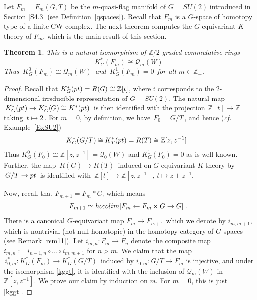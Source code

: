 \documentclass[11pt]{amsart}
\newtheorem{theorem}{Theorem}[section]
\theoremstyle{definition}
\theoremstyle{remark}
\numberwithin{equation}{section}
\newcommand{\la}{\label}
\def\cQ{\mathcal{Q}}
\def\Z{\mathbb{Z}}
\begin{document}
Let $ F_m = F_m(G,T) $ be the $m$-quasi-flag manifold of $G = SU(2) $ introduced in Section \ref{S4.3} (see Definition~\ref{qspaces}). Recall that $ F_m $ is a $G$-space of homotopy type of a finite CW-complex. 
The next theorem computes the $G$-equivariant $K$-theory of $F_m$, which is the main result of this section.
 
\begin{theorem} 
\la{ektmq} 
This is a natural isomorphism of $\Z/2$-graded commutative rings
%
$$
K^{\ast}_G(F_m) \cong \cQ_m(W)
$$
%
Thus $\,K^0_G(F_m) \cong \cQ_m (W)\,$ and $\,K^1_G(F_m) = 0\,$ for all $ m \in \Z_+ $.
\end{theorem}
%
\begin{proof}
Recall that $K^{\ast}_G({\rm pt}) = R(G) \cong \Z[t]$, where $t$ corresponds to the $2$-dimensional irreducible representation of $G = SU(2)$. The natural map $\,K^{\ast}_G({\rm pt}) \to K^{\ast}_G(G) \cong K^{\ast}({\rm pt})\,$ is then identified with the projection $\,\Z[t] \to \Z\,$ taking $\, t \mapsto 2\,$. For $m=0$, by definition, we have $\,F_0=G/T\,$, and hence  ({\it cf.} Example~\ref{ExSU2})
%
\begin{equation} \la{kggt}
K^{\ast}_G(G/T) \cong 
K^{\ast}_T({\rm pt}) = 
R(T) \cong \Z[z,z^{-1}]\ . 
\end{equation}
%
Thus $K^0_G(F_0) \cong \Z[z,z^{-1}] = \cQ_0(W)$ and $K^1_G(F_0)=0$ as is well known. Further, the map $\,R(G) \to R(T)\,$ induced on $G$-equivariant $K$-theory by $\, G/T \to {\rm pt} \,$ is identified with $\,\Z[t] \to \Z[z,z^{-1}]\,,\ t \mapsto z+z^{-1}$.

Now, recall that $ F_{m+1} = F_m \ast G $, which means
%
\begin{equation} \la{fiberjoin} F_{m+1} \simeq {\rm hocolim}[F_m \leftarrow F_m \times G \to G]\ . \end{equation}
%
There is a canonical $G$-equivariant map $F_m \to F_{m+1}$ which we denote by $i_{m,m+1}$, which is nontrivial (not null-homotopic) in the homotopy category of $G$-spaces (see Remark \ref{rem11}). Let $ i_{m,n}: F_m \to F_n $ denote the composite map
$ i_{m,n} := i_{n-1,n} \circ \ldots \circ i_{m,m+1}$ for $n>m$.  We claim that the map $\,i_{0,m}^{\ast}: K_G^{\ast}(F_m) \to K^{\ast}_G(G/T)\,$ induced by $ i_{0,m}: G/T \to F_m $ is injective, and under the isomorphism \eqref{kggt}, it is identified with the inclusion of $ \cQ_m(W)$ in $\Z[z,z^{-1}]$. We prove our claim by induction on $m$. For $m=0$, this is just \eqref{kggt}.


\end{proof}
\end{document}
